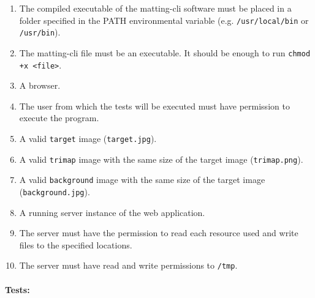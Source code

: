 \documentclass[a4paper]{article}
\begin{document}
\begin{enumerate}
    \item The compiled executable of the matting-cli software
    must be placed in a folder specified in the \textsc{PATH}
    environmental variable (e.g. \texttt{/usr/local/bin} or \texttt{/usr/bin}).
    \item The matting-cli file must be an executable. It should be enough to run
    \lstinline{chmod +x <file>}.
    \item A browser.
    \item The user from which the tests will be executed must have permission to execute
    the program.
    \item A valid \texttt{target} image (\texttt{target.jpg}).
    \item A valid \texttt{\gls{trimap}} image with the same size of the target image (\texttt{trimap.png}).
    \item A valid \texttt{background} image with the same size of the target image (\texttt{background.jpg}).
    \item A running server instance of the web application.
    \item The server must have the permission to read each resource used and write files
    to the specified locations.
    \item The server must have read and write permissions to \texttt{/tmp}.
\end{enumerate}

\paragraph{Tests:}


\end{document}
